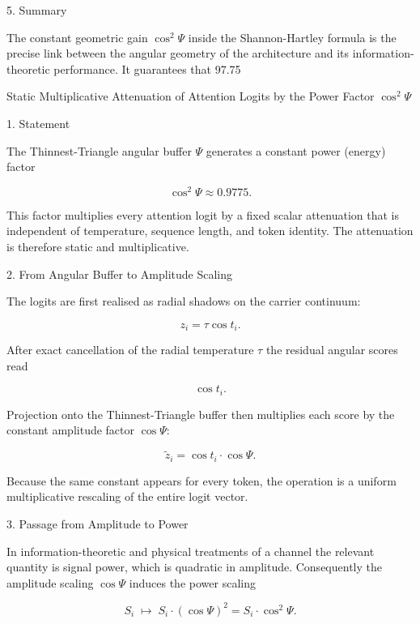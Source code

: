 5. Summary

The constant geometric gain \(\cos^2\Psi\) inside the Shannon-Hartley formula is the precise link between the angular geometry of the architecture and its information-theoretic performance. It guarantees that 97.75 %

Static Multiplicative Attenuation of Attention Logits by the Power Factor \(\cos^2\Psi\)

1. Statement

The Thinnest-Triangle angular buffer \(\Psi\) generates a constant power (energy) factor

\[
\cos^2\Psi\approx0.9775.
\]

This factor multiplies every attention logit by a fixed scalar attenuation that is independent of temperature, sequence length, and token identity. The attenuation is therefore static and multiplicative.

2. From Angular Buffer to Amplitude Scaling

The logits are first realised as radial shadows on the carrier continuum:

\[
z_i=\tau\cos t_i.
\]

After exact cancellation of the radial temperature \(\tau\) the residual angular scores read

\[
\cos t_i.
\]

Projection onto the Thinnest-Triangle buffer then multiplies each score by the constant amplitude factor \(\cos\Psi\):

\[
\tilde{z}_i=\cos t_i\cdot\cos\Psi.
\]

Because the same constant appears for every token, the operation is a uniform multiplicative rescaling of the entire logit vector.

3. Passage from Amplitude to Power

In information-theoretic and physical treatments of a channel the relevant quantity is signal power, which is quadratic in amplitude. Consequently the amplitude scaling \(\cos\Psi\) induces the power scaling

\[
S_i\;\longmapsto\;S_i\cdot(\cos\Psi)^2=S_i\cdot\cos^2\Psi.
\]


